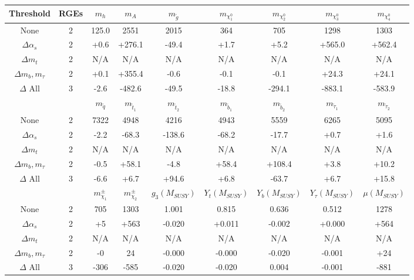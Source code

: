 \begin{table}
\begin{center}
\begin{tabular}{|c|c|ccccccc|}\hline
Threshold & RGEs \vphantom{\bigg[} & $m_h$   & $m_A$   & $m_{\tilde g}$   & $m_{\chi_1^0}$   & $m_{\chi_2^0}$   & $m_{\chi_3^0}$   & $m_{\chi_4^0}$   \\ \hline
None               & 2 & 125.0 & 2551 & 2015 &  364 &  705 & 1298 &1303\\
$\Delta \alpha_s$  & 2 &  +0.6 & +276.1 & -49.4 &  +1.7 &  +5.2 & +565.0 &+562.4\\
$\Delta m_t$      & 2 & N/A & N/A & N/A & N/A & N/A & N/A & N/A  \\
$\Delta m_b, m_\tau$& 2 &  +0.1 & +355.4 &  -0.6 &  -0.1 &  -0.1 & +24.3 &+24.1\\
$\Delta$ All      & 3 &  -2.6 & -482.6 & -49.5 & -18.8 & -294.1 & -883.1 &-583.9\\

%
\hline & \vphantom{\bigg[}  & $m_{{\tilde q}}$  & $m_{{\tilde t}_1}$  & $m_{{\tilde t}_2}$  & $m_{{\tilde b}_1}$  & $m_{{\tilde b}_2}$  & $m_{{\tilde \tau}_1}$  & $m_{{\tilde \tau}_2}$ \\ \hline
None             & 2 &7322 & 4948 & 4216 & 4943 & 5559 & 6265 &5095\\
$\Delta \alpha_s$  & 2 &  -2.2 & -68.3 & -138.6 & -68.2 & -17.7 &  +0.7 & +1.6\\
$\Delta m_t$      & 2 & N/A & N/A & N/A & N/A & N/A & N/A & N/A \\
$\Delta m_b, m_\tau$& 2 &  -0.5 & +58.1 &  -4.8 & +58.4 & +108.4 &  +3.8 &+10.2\\
$\Delta$ All      & 3 &  -6.6 &  +6.7 & +94.6 &  +6.8 & -63.7 &  +6.7 &+15.8\\

%
\hline & \vphantom{\bigg[}  & $m_{\chi_1}^\pm$  & $m_{\chi_2}^\pm$  & $g_3(M_{SUSY})$  & $Y_t(M_{SUSY})$  & $Y_b(M_{SUSY})$  & $Y_\tau(M_{SUSY})$  & $\mu(M_{SUSY})$     \\ \hline
 None                   & 2 &  705 & 1303 & 1.001 & 0.815 & 0.636 & 0.512 & 1278\\
$\Delta \alpha_s$  & 2 &    +5 &  +563 & -0.020 & +0.011 & -0.002 & +0.000 &  +564\\
$\Delta m_t$      & 2 & N/A & N/A & N/A & N/A & N/A & N/A& N/A\\
$\Delta m_b, m_\tau$& 2 &   -0 &   24 & -0.000 & -0.000 & -0.020 & -0.001 &   +24\\
$\Delta$ All      & 3 & -306 & -585 & -0.020 & -0.020 & 0.004 & -0.001 & -881\\


\end{tabular}
\end{center}
\end{table}
